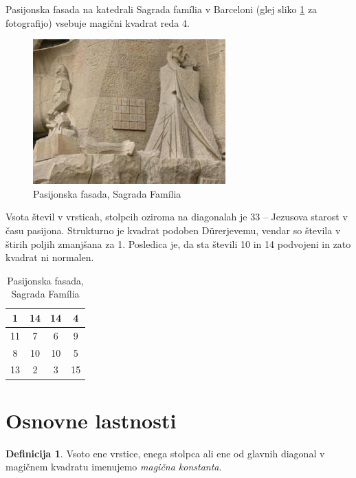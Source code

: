 \documentclass[a4paper,12pt]{article}
\theoremstyle{definition}
\newtheorem{definicija}{Definicija}
\theoremstyle{plain}
\newcommand{\pojem}[1]{\emph{\color{purple}#1}}
\begin{document}
Pasijonska fasada na katedrali Sagrada família v Barceloni
(glej sliko \ref{fig:sagrada} za fotografijo) vsebuje magični kvadrat reda 4.

\begin{figure}[!ht]
\centering
\caption{Pasijonska fasada, Sagrada Família}
\label{fig:sagrada}
\includegraphics{sagrada.png} 
\end{figure}


Vsota števil v vrsticah, stolpcih oziroma na diagonalah je 33 -- Jezusova starost
v času pasijona. Strukturno je kvadrat podoben Dürerjevemu, vendar so števila
v štirih poljih zmanjšana za 1. Posledica je, da sta števili 10 in 14 podvojeni
in zato kvadrat ni normalen.
%
\begin{table}
\centering
\caption{Pasijonska fasada, Sagrada Família}
\label{table:sagrada}
\begin{tabular}{cccc}\toprule
   1 & 14 & 14 &  4 \\ \midrule
  11 &  7 &  6 &  9 \\ \midrule
   8 & 10 & 10 &  5 \\ \midrule
  13 &  2 &  3 & 15 \\ \bottomrule
\end{tabular}
\end{table}


\newpage
\section{Osnovne lastnosti}

\begin{definicija}
Vsoto ene vrstice, enega stolpca ali ene od glavnih diagonal
v magičnem kvadratu imenujemo \pojem{magična konstanta}. 
\end{definicija}
\end{document}
